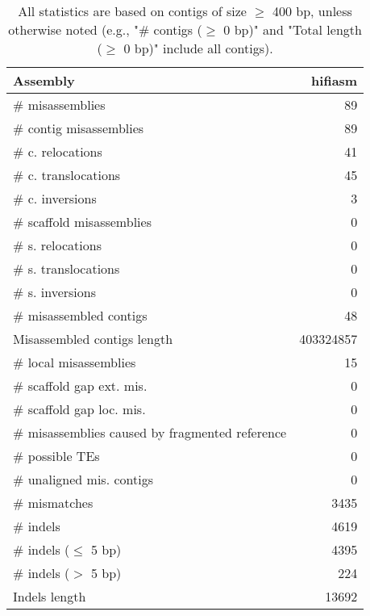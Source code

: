 \documentclass[12pt,a4paper]{article}
\begin{document}
\begin{table}[ht]
\begin{center}
\caption{All statistics are based on contigs of size $\geq$ 400 bp, unless otherwise noted (e.g., "\# contigs ($\geq$ 0 bp)" and "Total length ($\geq$ 0 bp)" include all contigs).}
\begin{tabular}{|l*{1}{|r}|}
\hline
Assembly & hifiasm \\ \hline
\# misassemblies & 89 \\ \hline
\hspace{2mm}\# contig misassemblies & 89 \\ \hline
\hspace{5mm}\# c. relocations & 41 \\ \hline
\hspace{5mm}\# c. translocations & 45 \\ \hline
\hspace{5mm}\# c. inversions & 3 \\ \hline
\hspace{2mm}\# scaffold misassemblies & 0 \\ \hline
\hspace{5mm}\# s. relocations & 0 \\ \hline
\hspace{5mm}\# s. translocations & 0 \\ \hline
\hspace{5mm}\# s. inversions & 0 \\ \hline
\# misassembled contigs & 48 \\ \hline
Misassembled contigs length & 403324857 \\ \hline
\# local misassemblies & 15 \\ \hline
\# scaffold gap ext. mis. & 0 \\ \hline
\# scaffold gap loc. mis. & 0 \\ \hline
\# misassemblies caused by fragmented reference & 0 \\ \hline
\# possible TEs & 0 \\ \hline
\# unaligned mis. contigs & 0 \\ \hline
\# mismatches & 3435 \\ \hline
\# indels & 4619 \\ \hline
\hspace{5mm}\# indels ($\leq$ 5 bp) & 4395 \\ \hline
\hspace{5mm}\# indels ($>$ 5 bp) & 224 \\ \hline
Indels length & 13692 \\ \hline
\end{tabular}
\end{center}
\end{table}
\end{document}
